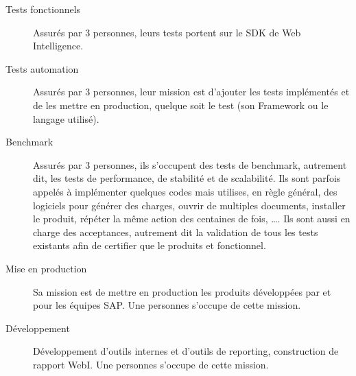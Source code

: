 \begin{description}
	\item[Tests fonctionnels] Assurés par 3 personnes, leurs tests portent sur le SDK de Web Intelligence. 
	\item[Tests automation] Assurés par 3 personnes, leur mission est d'ajouter les tests implémentés et de les mettre en production, quelque soit le test (son Framework ou le langage utilisé).
	\item[Benchmark] Assurés par 3 personnes, ils s'occupent des tests de benchmark, autrement dit, les tests de performance, de stabilité et de scalabilité. Ils sont parfois appelés à implémenter quelques codes mais utilises, en règle général, des logiciels pour générer des charges, ouvrir de multiples documents, installer le produit, répéter la même action des centaines de fois, \ldots. Ils sont aussi en charge des acceptances, autrement dit la validation de tous les tests existants afin de certifier que le produits et fonctionnel.
	\item[Mise en production] Sa mission est de mettre en production les produits développées par et pour les équipes SAP. Une personnes s'occupe de cette mission.
	\item[Développement] Développement d'outils internes et d'outils de reporting, construction de rapport WebI. Une personnes s'occupe de cette mission.
\end{description}






